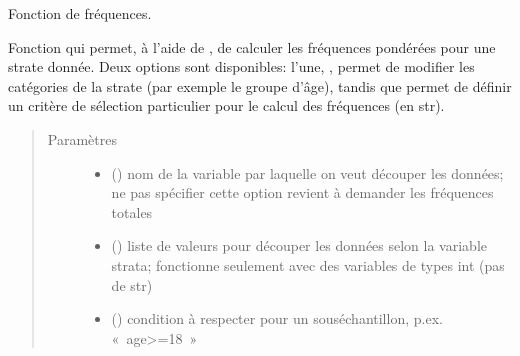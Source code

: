 \documentclass[letterpaper,10pt,french]{sphinxmanual}
\begin{document}
\begin{fulllineitems}
\begin{fulllineitems}
\begin{quote}
\begin{description}
\begin{itemize}
\end{itemize}

\end{description}\end{quote}

\end{fulllineitems}


\begin{fulllineitems}
\label{\detokenize{code:simgen.statistics.freq}}
Fonction de fréquences.

Fonction qui permet, à l’aide de , de calculer les fréquences pondérées pour une strate donnée. Deux options sont disponibles: l’une, , permet de modifier les catégories de la strate (par exemple le groupe d’âge), tandis que  permet de définir un critère de sélection particulier pour le calcul des fréquences (en str).
\begin{quote}\begin{description}
\item[{Paramètres}] \leavevmode\begin{itemize}
\item {} 
 () \textendash{} nom de la variable par laquelle on veut découper les données; ne pas spécifier cette option revient à demander les fréquences totales

\item {} 
 () \textendash{} liste de valeurs pour découper les données selon la variable strata; fonctionne seulement avec des variables de types int (pas de str)

\item {} 
 () \textendash{} condition à respecter pour un sous\sphinxhyphen{}échantillon, p.ex. « age\textgreater{}=18 »

\end{itemize}


\end{description}
\end{quote}
\end{fulllineitems}
\end{fulllineitems}
\end{document}

